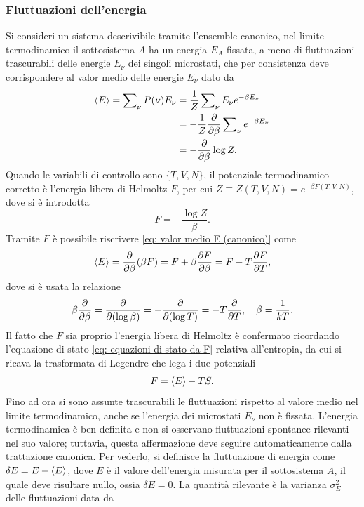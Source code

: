 \subsubsection{Fluttuazioni dell'energia}
Si consideri un sistema descrivibile tramite l'ensemble canonico, nel limite termodinamico il sottosistema $A$ ha un energia $E_A$ fissata, a meno di fluttuazioni trascurabili delle energie $E_\nu$ dei singoli microstati, che per consistenza deve corrispondere al valor medio delle energie $E_\nu$ dato da
\begin{equation}
\label{eq: valor medio E (canonico)}
    \begin{split}
        \langle E \rangle = \sum\nolimits_\nu P(\nu)E_\nu &= \frac{1}{Z}\sum\nolimits_\nu E_\nu e^{-\beta E_\nu} \\
        &= -\frac{1}{Z}\frac{\partial}{\partial\beta}\sum\nolimits_\nu e^{-\beta E_\nu} \\
        &= -\frac{\partial}{\partial\beta}\log{Z}.
    \end{split}
\end{equation}
Quando le variabili di controllo sono $\{T,V,N\}$, il potenziale termodinamico corretto è l'energia libera di Helmoltz $F$, per cui $Z \equiv Z(T,V,N) = e^{-\beta F(T,V,N)}$, dove si è introdotta
\begin{equation}
    F = -\frac{\log{Z}}{\beta}.
\end{equation}
Tramite $F$ è possibile riscrivere \eqref{eq: valor medio E (canonico)} come
\begin{equation}
    \langle E \rangle = \frac{\partial}{\partial\beta}(\beta F) = F + \beta\frac{\partial F}{\partial\beta} = F - T\frac{\partial F}{\partial T},
\end{equation}
dove si è usata la relazione
\begin{equation}
    \beta\frac{\partial}{\partial\beta} = \frac{\partial}{\partial(\log{\beta})} = -\frac{\partial}{\partial(\log{T})} = -T\frac{\partial}{\partial T},\quad \beta = \frac{1}{kT}.
\end{equation}
Il fatto che $F$ sia proprio l'energia libera di Helmoltz è confermato ricordando l'equazione di stato \eqref{eq: equazioni di stato da F} relativa all'entropia, da cui si ricava la trasformata di Legendre che lega i due potenziali
\begin{equation}
    F = \langle E \rangle -TS.
\end{equation}
Fino ad ora si sono assunte trascurabili le fluttuazioni rispetto al valore medio nel limite termodinamico, anche se l'energia dei microstati $E_\nu$ non è fissata. L'energia termodinamica è ben definita e non si osservano fluttuazioni spontanee rilevanti nel suo valore; tuttavia, questa affermazione deve seguire automaticamente dalla trattazione canonica. Per vederlo, si definisce la fluttuazione di energia come $\delta E = E - \langle E \rangle$, dove $E$ è il valore dell'energia misurata per il sottosistema $A$, il quale deve risultare nullo, ossia $\delta E = 0$. La quantità rilevante è la varianza $\sigma_E^2$ delle fluttuazioni data da

